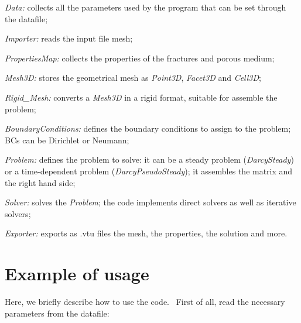 \begin{DoxyItemize}
\item {\itshape Data\+:} collects all the parameters used by the program that can be set through the datafile;~\newline

\item {\itshape Importer\+:} reads the input file mesh;~\newline

\item {\itshape Properties\+Map\+:} collects the properties of the fractures and porous medium;~\newline

\item {\itshape Mesh3D\+:} stores the geometrical mesh as {\itshape Point3D}, {\itshape Facet3D} and {\itshape Cell3D};~\newline

\item {\itshape Rigid\+\_\+\+Mesh\+:} converts a {\itshape Mesh3D} in a rigid format, suitable for assemble the problem;~\newline

\item {\itshape Boundary\+Conditions\+:} defines the boundary conditions to assign to the problem; B\+Cs can be Dirichlet or Neumann;~\newline

\item {\itshape Problem\+:} defines the problem to solve\+: it can be a steady problem ({\itshape Darcy\+Steady}) or a time-\/dependent problem ({\itshape Darcy\+Pseudo\+Steady}); it assembles the matrix and the right hand side;~\newline

\item {\itshape Solver\+:} solves the {\itshape Problem}; the code implements direct solvers as well as iterative solvers;~\newline

\item {\itshape Exporter\+:} exports as \textquotesingle{}.vtu\textquotesingle{} files the mesh, the properties, the solution and more.~\newline
 
\end{DoxyItemize}\hypertarget{index_es}{}\section{Example of usage}\label{index_es}
Here, we briefly describe how to use the code.~\newline
 First of all, read the necessary parameters from the datafile\+:~\newline
 
